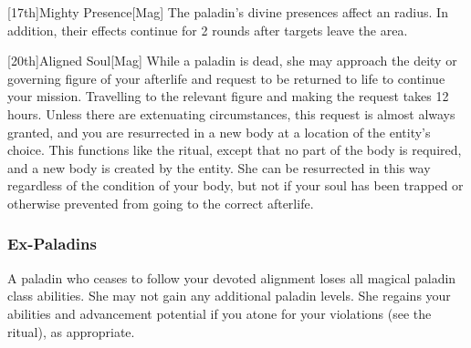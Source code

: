         [17th]{Mighty Presence}[Mag]
        The paladin's divine presences affect an \areahuge radius.
        In addition, their effects continue for 2 rounds after targets leave the area.

        [20th]{Aligned Soul}[Mag]
        While a paladin is dead, she may approach the deity or governing figure of your afterlife and request to be returned to life to continue your mission.
        Travelling to the relevant figure and making the request takes 12 hours.
        Unless there are extenuating circumstances, this request is almost always granted, and you are resurrected in a new body at a location of the entity's choice.
        This functions like the  ritual, except that no part of the body is required, and a new body is created by the entity.
        She can be resurrected in this way regardless of the condition of your body, but not if your soul has been trapped or otherwise prevented from going to the correct afterlife.

        \subsubsection{Ex-Paladins}
            A paladin who ceases to follow your devoted alignment loses all magical paladin class abilities.
            She may not gain any additional paladin levels.
            She regains your abilities and advancement potential if you atone for your violations (see the  ritual), as appropriate.

